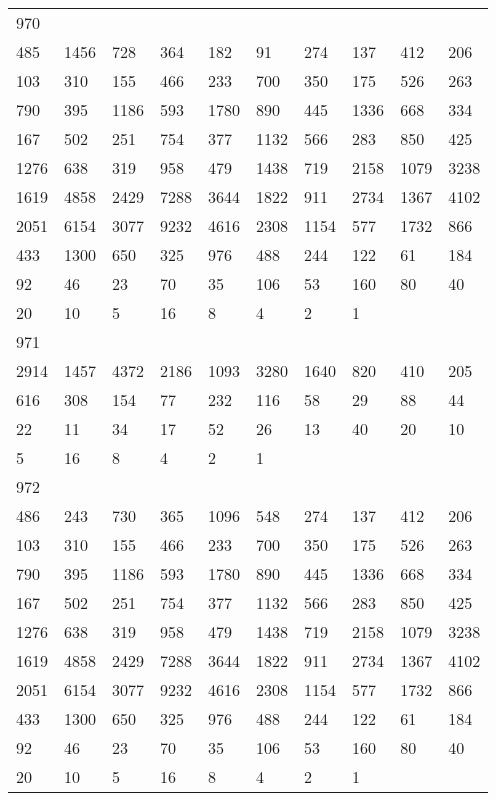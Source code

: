 \begin{longtable}{*{10}{l}}
970&&&&&&&&&\\
485& 1456& 728& 364& 182& 91& 274& 137& 412& 206\\
103& 310& 155& 466& 233& 700& 350& 175& 526& 263\\
790& 395& 1186& 593& 1780& 890& 445& 1336& 668& 334\\
167& 502& 251& 754& 377& 1132& 566& 283& 850& 425\\
1276& 638& 319& 958& 479& 1438& 719& 2158& 1079& 3238\\
1619& 4858& 2429& 7288& 3644& 1822& 911& 2734& 1367& 4102\\
2051& 6154& 3077& 9232& 4616& 2308& 1154& 577& 1732& 866\\
433& 1300& 650& 325& 976& 488& 244& 122& 61& 184\\
92& 46& 23& 70& 35& 106& 53& 160& 80& 40\\
20& 10& 5& 16& 8& 4& 2& 1& \\

971&&&&&&&&&\\
2914& 1457& 4372& 2186& 1093& 3280& 1640& 820& 410& 205\\
616& 308& 154& 77& 232& 116& 58& 29& 88& 44\\
22& 11& 34& 17& 52& 26& 13& 40& 20& 10\\
5& 16& 8& 4& 2& 1& \\

972&&&&&&&&&\\
486& 243& 730& 365& 1096& 548& 274& 137& 412& 206\\
103& 310& 155& 466& 233& 700& 350& 175& 526& 263\\
790& 395& 1186& 593& 1780& 890& 445& 1336& 668& 334\\
167& 502& 251& 754& 377& 1132& 566& 283& 850& 425\\
1276& 638& 319& 958& 479& 1438& 719& 2158& 1079& 3238\\
1619& 4858& 2429& 7288& 3644& 1822& 911& 2734& 1367& 4102\\
2051& 6154& 3077& 9232& 4616& 2308& 1154& 577& 1732& 866\\
433& 1300& 650& 325& 976& 488& 244& 122& 61& 184\\
92& 46& 23& 70& 35& 106& 53& 160& 80& 40\\
20& 10& 5& 16& 8& 4& 2& 1& \\


\end{longtable}
